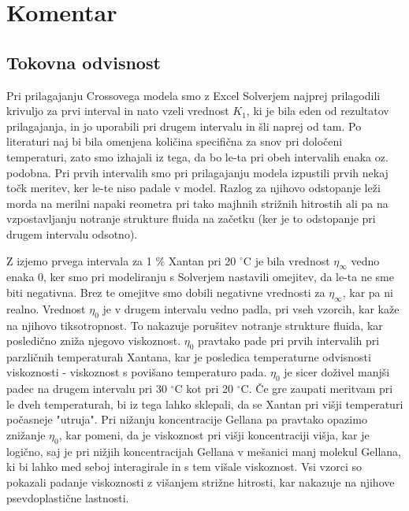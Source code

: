\documentclass{article}
\begin{document}
\section{Komentar}

\subsection{Tokovna odvisnost}
Pri prilagajanju Crossovega modela smo z Excel Solverjem najprej prilagodili krivuljo za prvi interval in nato vzeli vrednost $K_1$, ki je bila eden od rezultatov prilagajanja, in jo uporabili pri drugem intervalu in šli naprej od tam. Po literaturi naj bi bila omenjena količina specifična za snov pri določeni temperaturi, zato smo izhajali iz tega, da bo le-ta pri obeh intervalih enaka oz. podobna. Pri prvih intervalih smo pri prilagajanju modela izpustili prvih nekaj točk meritev, ker le-te niso padale v model. Razlog za njihovo odstopanje leži morda na merilni napaki reometra pri tako majhnih strižnih hitrostih ali pa na vzpostavljanju notranje strukture fluida na začetku (ker je to odstopanje pri drugem intervalu odsotno).

Z izjemo prvega intervala za 1 \% Xantan pri 20 $^\circ$C je bila vrednost $\eta_{\infty}$ vedno enaka 0, ker smo pri modeliranju s Solverjem nastavili omejitev, da le-ta ne sme biti negativna. Brez te omejitve smo dobili negativne vrednosti za $\eta_{\infty}$, kar pa ni realno. Vrednost $\eta_0$ je v drugem intervalu vedno padla, pri vseh vzorcih, kar kaže na njihovo tiksotropnost. To nakazuje porušitev notranje strukture fluida, kar posledično zniža njegovo viskoznost. $\eta_0$ pravtako pade pri prvih intervalih pri parzličnih temperaturah Xantana, kar je posledica temperaturne odvisnosti viskoznosti - viskoznost s povišano temperaturo pada. $\eta_0$ je sicer doživel manjši padec na drugem intervalu pri 30 $^\circ$C kot pri 20 $^\circ$C. Če gre zaupati meritvam pri le dveh temperaturah, bi iz tega lahko sklepali, da se Xantan pri višji temperaturi počasneje "utruja". Pri nižanju koncentracije Gellana pa pravtako opazimo znižanje $\eta_0$, kar pomeni, da je viskoznost pri višji koncentraciji višja, kar je logično, saj je pri nižjih koncentracijah Gellana v mešanici manj molekul Gellana, ki bi lahko med seboj interagirale in s tem višale viskoznost. Vsi vzorci so pokazali padanje viskoznosti z višanjem  strižne hitrosti, kar nakazuje na njihove psevdoplastične lastnosti.
\end{document}
